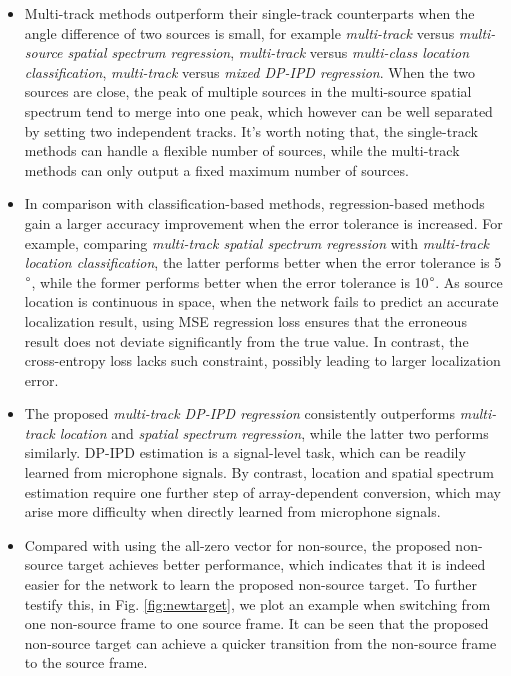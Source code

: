 \documentclass[lettersize,journal]{IEEEtran}
\begin{document}
\begin{itemize}[leftmargin=*]
\item Multi-track methods outperform their single-track counterparts when the angle difference of two sources is small, for example \textit{multi-track} versus \textit{multi-source spatial spectrum regression}, \textit{multi-track} versus \textit{multi-class location classification}, \textit{multi-track} versus \textit{mixed DP-IPD regression}.  When the two sources are close, the peak of multiple sources in the multi-source spatial spectrum tend to merge into one peak, which however can be well separated by setting two independent tracks. It's worth noting that, the  single-track methods can handle a flexible number of sources, while the multi-track methods can only output a fixed maximum number of sources. 
\item In comparison with classification-based methods, regression-based methods gain a larger accuracy improvement when the error tolerance is increased. For example, comparing \textit{multi-track spatial spectrum regression} with \textit{multi-track location classification}, the latter performs better when the error tolerance is 5$\degree$, while the former performs better when the error tolerance is 10$\degree$. As source location is continuous in space, when the network fails to predict an accurate localization result, using MSE regression loss ensures that the erroneous result does not deviate significantly from the true value. In contrast, the cross-entropy loss lacks such constraint, possibly leading to larger localization error.
\item  The proposed \textit{multi-track DP-IPD regression} consistently outperforms \textit{multi-track location} and \textit{spatial spectrum regression}, while the latter two performs similarly. DP-IPD estimation is a signal-level task, which can be readily learned from  microphone signals. By contrast, location and spatial spectrum estimation require one further step of array-dependent conversion, which may arise more difficulty when directly learned from microphone signals.
\item Compared with using the all-zero vector for non-source, the proposed non-source target achieves better performance, which indicates that it is indeed easier for the network to learn the proposed non-source target.  
To further testify this, in Fig. \ref{fig:newtarget}, we plot an example when switching from one non-source frame to one source frame. 
It can be seen that the proposed non-source target can achieve a quicker transition from the non-source frame to the source frame.
\end{itemize}
\end{document}
